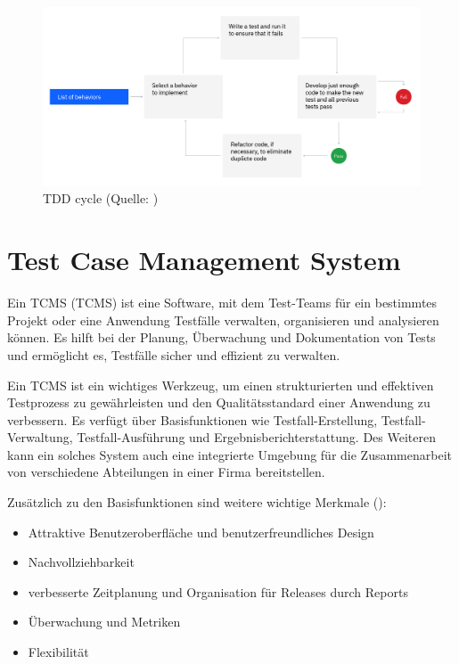 \documentclass[a4paper, fontsize=11pt, parskip=half, twoside]{scrreprt}
\begin{document}
	\begin{figure}[ht]
		\centering
		\includegraphics[scale=0.25]{assets/tdd-cycle.png}
		\caption{\acl{TDD} cycle (Quelle: \textcite{noauthor_test-driven_nodate})}
		\label{fig:tdd-cycle}
	\end{figure}
	
	\section{Test Case Management System} \label{sec:tcms}
	Ein \acl{TCMS} (\ac{TCMS}) ist eine Software, mit dem Test-Teams für ein bestimmtes Projekt oder eine Anwendung Testfälle verwalten, organisieren und analysieren können.
	Es hilft bei der Planung, Überwachung und Dokumentation von Tests und ermöglicht es, Testfälle sicher und effizient zu verwalten.
	
	Ein \ac{TCMS} ist ein wichtiges Werkzeug, um einen strukturierten und effektiven Testprozess zu gewährleisten und den Qualitätsstandard einer Anwendung zu verbessern.
	Es verfügt über Basisfunktionen wie Testfall-Erstellung, Testfall-Verwaltung, Testfall-Ausführung und Ergebnisberichterstattung. 
	Des Weiteren kann ein solches System auch eine integrierte Umgebung für die Zusammenarbeit von verschiedene Abteilungen in einer Firma bereitstellen.
	
	Zusätzlich zu den Basisfunktionen sind weitere wichtige Merkmale (\textcite{lead_articles_nodate}):
	
	\begin{itemize}
		\item Attraktive Benutzeroberfläche und benutzerfreundliches Design
		\item Nachvollziehbarkeit
		\item verbesserte Zeitplanung und Organisation für Releases durch Reports
		\item Überwachung und Metriken
		\item Flexibilität
	\end{itemize}
	
\end{document}
